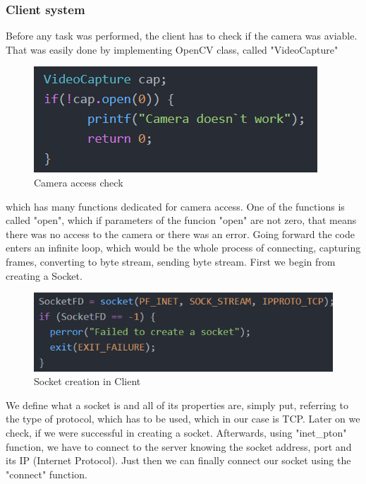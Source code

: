 \documentclass[conference]{IEEEtran}
\begin{document}
\subsubsection{Client system}
Before any task was performed, the client has to check if the camera was aviable. That was easily done by implementing OpenCV class, called "VideoCapture"
\begin{figure}[h!]
	\includegraphics[width=\linewidth]{ClientCodeExample1.png}
	\caption{Camera access check}
	\label{fig:CCE1}
\end{figure}
which has many functions dedicated for camera access. One of the functions is called "open", which if parameters of the funcion "open" are not zero, that means there was no access to the camera or there was an error.
\newline
Going forward the code enters an infinite loop, which would be the whole process of connecting, capturing frames, converting to byte stream, sending byte stream. First we begin from creating a Socket.
\begin{figure}[h!]
	\includegraphics[width=\linewidth]{ClientCodeExample2.png}
	\caption{Socket creation in Client}
	\label{fig:CCE2}
\end{figure}
We define what a socket is and all of its properties are, simply put, referring to the type of protocol, which has to be used, which in our case is TCP. Later on we check, if we were successful in creating a socket.
\newline
Afterwards, using "inet\_pton" function, we have to connect to the server knowing the socket address, port and its IP (Internet Protocol). Just then we can finally connect our socket using the "connect" function.
\end{document}
